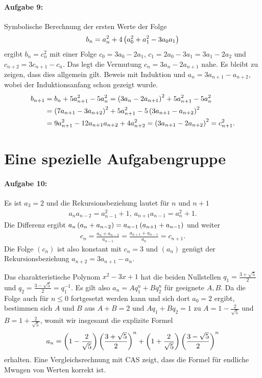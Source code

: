 \documentclass[11pt,a4paper]{article}
\begin{document}
\paragraph{Aufgabe 9:}
Symbolische Berechnung der ersten Werte der Folge
\begin{gather*}
  b_n=a_n^2+4\left(a_0^2+a_1^2-3a_0a_1\right)
\end{gather*}
ergibt $b_n=c_n^2$ mit einer Folge $c_0=3a_0-2a_1$, $c_1=2a_0-3a_1=3a_1-2a_2$
und $c_{n+2}=3c_{n+1}-c_n$.  Das legt die Vermutung $c_n=3a_n-2a_{n+1}$
nahe. Es bleibt zu zeigen, dass dies allgemein gilt.  Beweis mit Induktion und
$a_n=3a_{n+1}-a_{n+2}$, wobei der Induktionsanfang schon gezeigt wurde.
\begin{align*}
  b_{n+1}&=b_n+5a_{n+1}^2-5a_n^2=\left(3a_n-2a_{n+1}\right)^2+5a_{n+1}^2-5a_n^2\\
  &=\left(7a_{n+1}-3a_{n+2}\right)^2+5a_{n+1}^2-5\left(3a_{n+1}-a_{n+2}\right)^2\\
  &=9a_{n+1}^2-12a_{n+1}a_{n+2}+4a_{n+2}^2=\left(3a_{n+1}-2a_{n+2}\right)^2=c_{n+1}^2.
\end{align*}

\section*{Eine spezielle Aufgabengruppe}

\paragraph{Aufgabe 10:}
Es ist $a_3=2$ und die Rekursionsbeziehung lautet für $n$ und $n+1$ 
\begin{gather*}
  a_na_{n-2}=a_{n-1}^2+1,\ a_{n+1}a_{n-1}=a_n^2+1.
\end{gather*}
Die Differenz ergibt $a_n\left(a_n+a_{n-2}\right)=a_{n-1}\left(a_{n+1}+a_{n-1}\right)$ und
weiter 
\begin{gather*}
  c_n=\frac{a_n+a_{n-2}}{a_{n-1}}=\frac{a_{n+1}+a_{n-1}}{a_n}=c_{n+1}.
\end{gather*}
Die Folge $(c_n)$ ist also konstant mit $c_n=3$ und $(a_n)$ genügt der
Rekursionsbeziehung $a_{n+2}=3a_{n+1}-a_n$.

Das charakteristische Polynom $x^2-3x+1$ hat die beiden Nullstellen
$q_1=\frac{3+\sqrt{5}}{2}$ und $q_2=\frac{3-\sqrt{5}}{2}=q_1^{-1}$.  Es gilt
also $a_n=Aq_1^n+Bq_2^n$ für geeignete $A,B$.  Da die Folge auch für $n\le 0$
fortgesetzt werden kann und sich dort $a_0=2$ ergibt, bestimmen sich $A$ und
$B$ aus $A+B=2$ und $Aq_1+Bq_2=1$ zu $A=1-\frac{2}{\sqrt{5}}$ und
$B=1+\frac{2}{\sqrt{5}}$, womit wir insgesamt die explizite Formel
\begin{gather*}
  a_n=\left(1-\frac{2}{\sqrt{5}}\right)\left(\frac{3+\sqrt{5}}{2}\right)^n
  +\left(1+\frac{2}{\sqrt{5}}\right)\left(\frac{3-\sqrt{5}}{2}\right)^n 
\end{gather*}
erhalten.  Eine Vergleichsrechnung mit CAS zeigt, dass die Formel für endliche
Mwngen von Werten korrekt ist.
\end{document}
